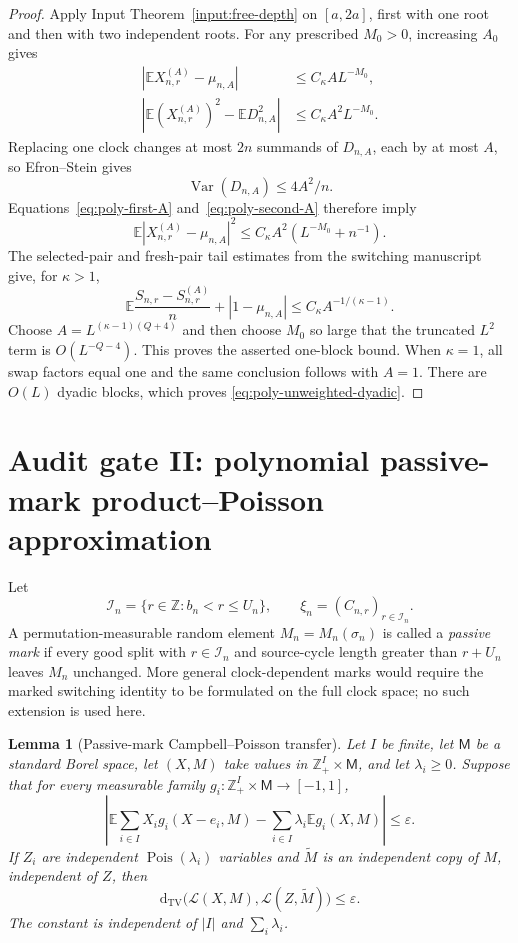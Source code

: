 \documentclass[11pt]{article}
\newtheorem{lemma}[theorem]{Lemma}
\theoremstyle{remark}
\newcommand{\Ee}{\mathbb E}
\newcommand{\Var}{\operatorname{Var}}
\newcommand{\Pois}{\operatorname{Pois}}
\newcommand{\TV}{\mathrm d_{\mathrm{TV}}}
\newcommand{\cL}{\mathcal L}
\begin{document}
\begin{proof}
Apply Input Theorem~\ref{input:free-depth} on $[a,2a]$, first with one root
and then with two independent roots.  For any prescribed $M_0>0$, increasing
$A_0$ gives
\begin{align}
 |\Ee X_{n,r}^{(A)}-\mu_{n,A}|&\le C_\kappa A L^{-M_0},
 \label{eq:poly-first-A}\\
 |\Ee(X_{n,r}^{(A)})^2-\Ee D_{n,A}^2|&\le C_\kappa A^2L^{-M_0}.
 \label{eq:poly-second-A}
\end{align}
Replacing one clock changes at most $2n$ summands of $D_{n,A}$, each by at
most $A$, so Efron--Stein gives
\[
 \Var(D_{n,A})\le4A^2/n.
\]
Equations~\eqref{eq:poly-first-A} and~\eqref{eq:poly-second-A} therefore
imply
\[
 \Ee|X_{n,r}^{(A)}-\mu_{n,A}|^2
 \le C_\kappa A^2(L^{-M_0}+n^{-1}).
\]
The selected-pair and fresh-pair tail estimates from the switching
manuscript give, for $\kappa>1$,
\[
 \Ee\frac{S_{n,r}-S_{n,r}^{(A)}}n+|1-\mu_{n,A}|
 \le C_\kappa A^{-1/(\kappa-1)}.
\]
Choose $A=L^{(\kappa-1)(Q+4)}$ and then choose $M_0$ so large that the
truncated $L^2$ term is $O(L^{-Q-4})$.  This proves the asserted one-block
bound.  When $\kappa=1$, all swap factors equal one and the same conclusion
follows with $A=1$.  There are $O(L)$ dyadic blocks, which proves
\eqref{eq:poly-unweighted-dyadic}.
\end{proof}

\section{Audit gate II: polynomial passive-mark product--Poisson approximation}
\label{sec:poly-pp}

Let
\[
 \mathcal I_n=\{r\in\mathbb Z:b_n<r\le U_n\},
 \qquad
 \xi_n=(C_{n,r})_{r\in\mathcal I_n}.
\]
A permutation-measurable random element $M_n=M_n(\sigma_n)$ is called a
\emph{passive mark} if every good split with $r\in\mathcal I_n$ and
source-cycle length greater than $r+U_n$ leaves $M_n$ unchanged.  More
general clock-dependent marks would require the marked switching identity to
be formulated on the full clock space; no such extension is used here.

\begin{lemma}[Passive-mark Campbell--Poisson transfer]
\label{lem:passive-Stein}
Let $I$ be finite, let $\mathsf M$ be a standard Borel space, let $(X,M)$
take values in $\mathbb Z_+^I\times\mathsf M$, and let $\lambda_i\ge0$.
Suppose that for every measurable family
$g_i:\mathbb Z_+^I\times\mathsf M\to[-1,1]$,
\[
 \left|
 \Ee\sum_{i\in I}X_i g_i(X-e_i,M)
 -\sum_{i\in I}\lambda_i\Ee g_i(X,M)
 \right|\le\varepsilon.
\]
If $Z_i$ are independent $\Pois(\lambda_i)$ variables and $\widetilde M$ is
an independent copy of $M$, independent of $Z$, then
\[
 \TV\bigl(\cL(X,M),\cL(Z,\widetilde M)\bigr)\le\varepsilon.
\]
The constant is independent of $|I|$ and $\sum_i\lambda_i$.
\end{lemma}
\end{document}
